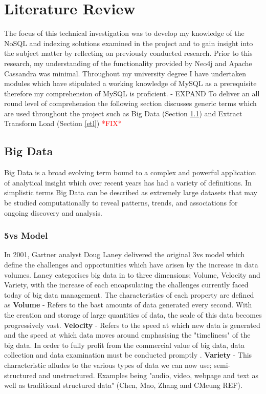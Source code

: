 \chapter{Literature Review}
The focus of this technical investigation was to develop my knowledge of the NoSQL and indexing solutions examined in the project and to gain insight into the subject matter by reflecting on previously conducted research. Prior to this research, my understanding of the functionality provided by Neo4j and Apache Cassandra was minimal. Throughout my university degree I have undertaken modules which have stipulated a working knowledge of MySQL as a prerequisite therefore my comprehension of MySQL is proficient. - EXPAND
To deliver an all round level of comprehension the following section discusses generic terms which are used throughout the project such as Big Data (Section \ref{bigdata}) and Extract Transform Load (Section \ref{etl}) \textcolor{red}{*FIX*}

\section{Big Data}\label{bigdata}
Big Data is a broad evolving term bound to a complex and powerful application of analytical insight which over recent years has had a variety of definitions. In simplistic terms Big Data can be described as extremely large datasets that may be studied computationally to reveal patterns, trends, and associations for ongoing discovery and analysis.

\subsection{5vs Model}
In 2001, Gartner analyst Doug Laney delivered the original 3vs model which define the challenges and opportunities which have arisen by the increase in data volumes. Laney categorises big data in to three dimensions; Volume, Velocity and Variety, with the increase of each encapsulating the challenges currently faced today of big data management. The characteristics of each property are defined as \textbf{Volume} - Refers to the bast amounts of data generated every second. With the creation and storage of large quantities of data, the scale of this data becomes progressively vast. \textbf{Velocity} - Refers to the speed at which new data is generated and the speed at which data moves around emphasising the "timeliness" of the big data. In order to fully profit from the commercial value of big data, data collection and data examination must be conducted promptly . \textbf{Variety} - This characteristic alludes to the various types of data we can now use; semi-structured and unstructured. Examples being "audio, video, webpage and text as well as traditional structured data" (Chen, Mao, Zhang and CMeung REF).

